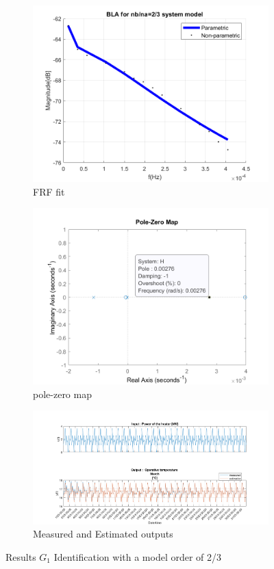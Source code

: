 \documentclass[a4paper,12pt]{article}
\numberwithin{equation}{section}
\begin{document}
\begin{figure}[H]
\centering
\begin{subfigure}{.5\textwidth}
  \centering
  \includegraphics[width=.7\linewidth]{G1mod23FrfFit.png}
  \caption{FRF fit}
  \label{fig:frf fit G1mod2/3}
\end{subfigure}%
\begin{subfigure}{.5\textwidth}
  \centering
  \includegraphics[width=.7\linewidth]{G1mod23pzmap.png}
  \caption{pole-zero map}
  \label{fig:pzmap G1mod2/3}
\end{subfigure}

\begin{subfigure}{\textwidth}
  \centering
  \includegraphics[scale=0.38]{G1mod23InOut.png}
  \caption{Measured and Estimated outputs}
  \label{fig:inoutG12/3}
\end{subfigure}
\caption{Results $G_{1}$ Identification with a model order of 2/3 }
\label{fig:G1mod2/3}
\end{figure}
\end{document}
